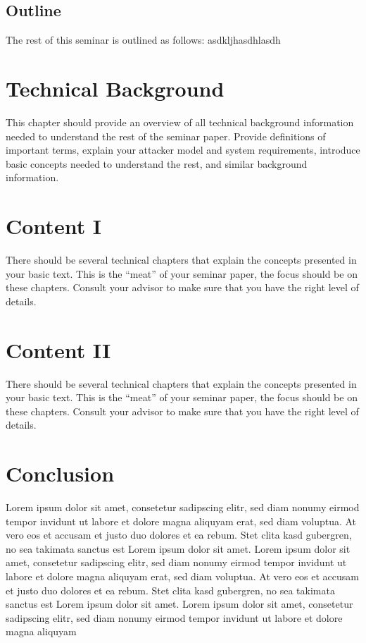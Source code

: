 \documentclass[a4paper,oneside,openright] {scrreprt}
\begin{document}
\section{Outline} 
\label{ch:intro:overview}

The rest of this seminar is outlined as follows:
asdkljhasdhlasdh

\chapter{Technical Background}
\label{ch:background}

This chapter should provide an overview of all technical background
information needed to understand the rest of the seminar paper. Provide
definitions of important terms, explain your attacker model and system
requirements, introduce basic concepts needed to understand the rest,
and similar background information.


\chapter{Content I} %
\label{ch:contentI}

There should be several technical chapters that explain the concepts
presented in your basic text. This is the ``meat'' of your seminar
paper, the focus should be on these chapters. Consult your advisor to
make sure that you have the right level of details.

\chapter{Content II} %
\label{ch:contentII}

There should be several technical chapters that explain the concepts
presented in your basic text. This is the ``meat'' of your seminar
paper, the focus should be on these chapters. Consult your advisor to
make sure that you have the right level of details.

\chapter{Conclusion}
\label{ch:conclusion}

Lorem ipsum dolor sit amet, consetetur sadipscing elitr, sed diam nonumy
eirmod tempor invidunt ut labore et dolore magna aliquyam erat, sed diam
voluptua. At vero eos et accusam et justo duo dolores et ea rebum. Stet clita
kasd gubergren, no sea takimata sanctus est Lorem ipsum dolor sit amet. Lorem
ipsum dolor sit amet, consetetur sadipscing elitr, sed diam nonumy eirmod
tempor invidunt ut labore et dolore magna aliquyam erat, sed diam voluptua. At
vero eos et accusam et justo duo dolores et ea rebum. Stet clita kasd
gubergren, no sea takimata sanctus est Lorem ipsum dolor sit amet. Lorem ipsum
dolor sit amet, consetetur sadipscing elitr, sed diam nonumy eirmod tempor
invidunt ut labore et dolore magna aliquyam




\end{document}
